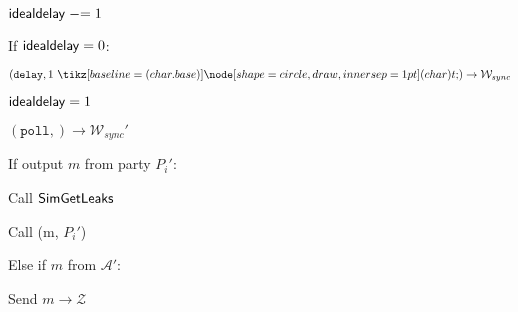 \begin{bbox}[title={Algorithm $\msf{Poll}$}]

\begin{renumerate}

  	\item ${\mathsf {idealdelay}} \mathrel{-}= 1$
  	
  	\item If ${\mathsf {idealdelay}} = 0$:
  	 
  		\quad \Send $(\texttt{delay}, 1 \token) \rightarrow \mathcal{W}_{sync}$

  		\quad ${\mathsf {idealdelay}} = 1$

  	\item \Send $(\texttt{poll},) \rightarrow \mathcal{W}_{sync}'$
 
  	\item If output $m$ from party $P_i'$:

			\quad Call ${\mathsf {SimGetLeaks}}$

			\quad Call (m, $P_i'$)
		
		Else if $m$ from $\mathcal{A}'$:

			\quad Send $m \rightarrow \mathcal{Z}$

\end{renumerate}

\end{bbox}
